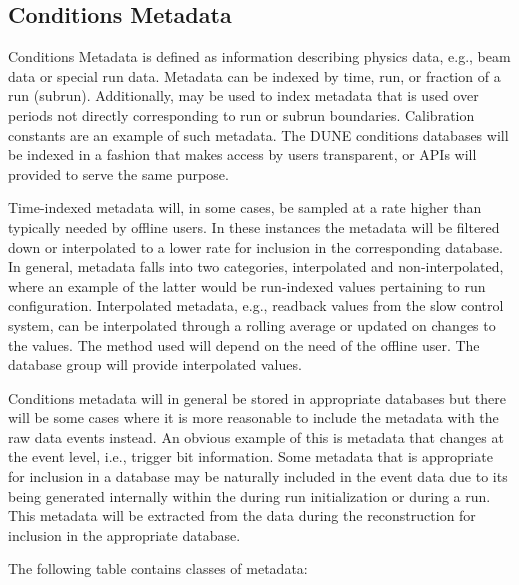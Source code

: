 \documentclass[../main-v1.tex]{subfiles}
\begin{document}
\subsection{Conditions Metadata}

Conditions Metadata is defined as information describing physics data, e.g., beam data or special run data. Metadata can be indexed by %
time, run, or fraction of a run (subrun). Additionally,  may be used to index metadata that is used over periods not directly corresponding to run or subrun boundaries. Calibration constants are an example of such metadata. The DUNE conditions databases will be indexed in a fashion that makes access by users transparent, or APIs will provided to serve the same purpose.

Time-indexed metadata will, in some cases, be sampled at a rate higher than typically needed by offline users. In these instances the metadata will be filtered down or interpolated to a lower rate for inclusion in the corresponding database. In general, metadata falls into two categories, interpolated and non-interpolated, where an example of the latter would be run-indexed values pertaining to run configuration. Interpolated metadata, e.g., readback values from the slow control system, can be interpolated through a rolling average or updated on changes to the values. The method used will depend on the need of the offline user. The database group will provide interpolated values.  

Conditions metadata will in general be stored in appropriate databases but there will be some cases where it is more reasonable to include the metadata with the raw data events instead. An obvious example of this is metadata that changes at the event level, i.e., trigger bit information. Some metadata that is appropriate for inclusion in a database may be naturally included in the event data due to its being generated internally within the  during run initialization or during a run. This metadata will be extracted from the data during the reconstruction for inclusion in the appropriate database. 

The following table contains classes of metadata: 
\end{document}
